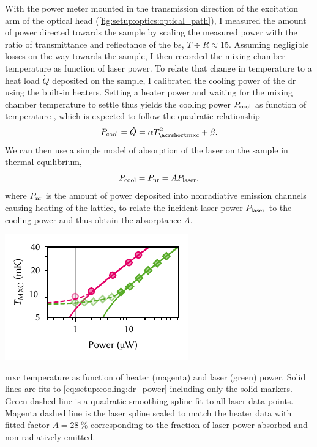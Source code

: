 With the power meter mounted in the transmission direction of the excitation arm of the optical head (\cf \cref{fig:setup:optics:optical_path}), I measured the amount of power directed towards the sample by scaling the measured power with the ratio of transmittance and reflectance of the \gls{bs}, $T\div R\approx\num{15}$.
Assuming negligible losses on the way towards the sample, I then recorded the mixing chamber temperature as function of laser power.
To relate that change in temperature to a heat load $\dot{Q}$ deposited on the sample, I calibrated the cooling power of the \gls{dr} using the built-in heaters.
Setting a heater power and waiting for the mixing chamber temperature to settle thus yields the cooling power $P_{\mathrm{cool}}$ as function of temperature \Tmxc, which is expected to follow the quadratic relationship~\cite{DeWaele2011}
\begin{equation}\label{eq:setup:cooling:dr_power}
    P_{\mr{cool}} = \dot{Q} = \alpha \Tmxc^2 + \beta.
\end{equation}
We can then use a simple model of absorption of the laser on the sample in thermal equilibrium,
\begin{equation}\label{eq:setup:cooling:absorptance}
    P_{\mathrm{cool}} = P_{\mathrm{nr}} = A P_{\mathrm{laser}},
\end{equation}
where $P_{\mathrm{nr}}$ is the amount of power deposited into nonradiative emission channels causing heating of the lattice, to relate the incident laser power $P_{\mathrm{laser}}$ to the cooling power and thus obtain the absorptance $A$.

\begin{marginfigure}[*-7]
    \centering
    \includegraphics{img/pdf/setup/laser_heating}
    \caption[]{
        \Acrlong{mxc} temperature as function of heater (magenta) and laser (green) power.
        Solid lines are fits to \cref{eq:setup:cooling:dr_power} including only the solid markers.
        Green dashed line is a quadratic smoothing spline fit to all laser data points.
        Magenta dashed line is the laser spline scaled to match the heater data with fitted factor $A=\qty{28}{\percent}$ corresponding to the fraction of laser power absorbed and non-radiatively emitted.
    }
    \label{fig:setup:cooling:laser}
\end{marginfigure}

